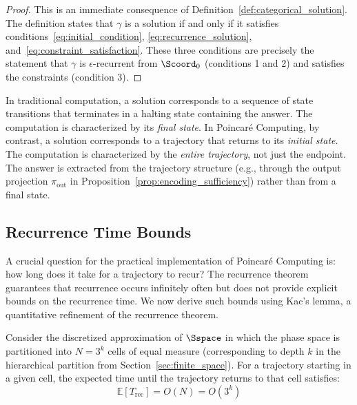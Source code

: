 \begin{proof}
This is an immediate consequence of Definition~\ref{def:categorical_solution}. The definition states that $\gamma$ is a solution if and only if it satisfies conditions~\eqref{eq:initial_condition}, \eqref{eq:recurrence_solution}, and~\eqref{eq:constraint_satisfaction}. These three conditions are precisely the statement that $\gamma$ is $\epsilon$-recurrent from $\Scoord_0$ (conditions 1 and 2) and satisfies the constraints (condition 3).
\end{proof}

\begin{remark}
\label{rem:halting_contrast}
In traditional computation, a solution corresponds to a sequence of state transitions that terminates in a halting state containing the answer. The computation is characterized by its \textit{final state}. In Poincaré Computing, by contrast, a solution corresponds to a trajectory that returns to its \textit{initial state}. The computation is characterized by the \textit{entire trajectory}, not just the endpoint. The answer is extracted from the trajectory structure (e.g., through the output projection $\pi_{\text{out}}$ in Proposition~\ref{prop:encoding_sufficiency}) rather than from a final state.
\end{remark}

\subsection{Recurrence Time Bounds}

A crucial question for the practical implementation of Poincaré Computing is: how long does it take for a trajectory to recur? The recurrence theorem guarantees that recurrence occurs infinitely often but does not provide explicit bounds on the recurrence time. We now derive such bounds using Kac's lemma, a quantitative refinement of the recurrence theorem.

\begin{theorem}
\label{thm:recurrence_time}
Consider the discretized approximation of $\Sspace$ in which the phase space is partitioned into $N = 3^k$ cells of equal measure (corresponding to depth $k$ in the hierarchical partition from Section~\ref{sec:finite_space}). For a trajectory starting in a given cell, the expected time until the trajectory returns to that cell satisfies:
\begin{equation}
\mathbb{E}[T_{\text{rec}}] = O(N) = O(3^k)
\label{eq:expected_recurrence}
\end{equation}
\end{theorem}

